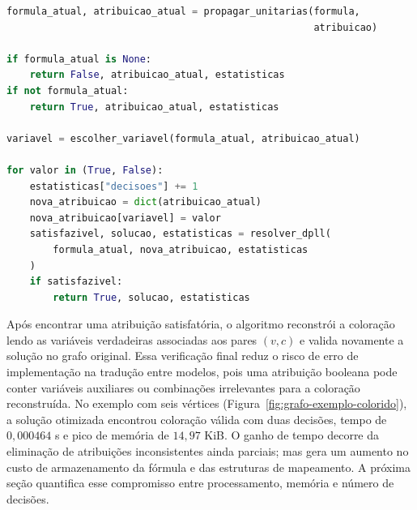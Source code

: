 \begin{lstlisting}[language=Python, caption={Estrutura do DPLL com propagação unitária}, label={lst:dpll}]
formula_atual, atribuicao_atual = propagar_unitarias(formula,
                                                     atribuicao)

if formula_atual is None:
    return False, atribuicao_atual, estatisticas
if not formula_atual:
    return True, atribuicao_atual, estatisticas

variavel = escolher_variavel(formula_atual, atribuicao_atual)

for valor in (True, False):
    estatisticas["decisoes"] += 1
    nova_atribuicao = dict(atribuicao_atual)
    nova_atribuicao[variavel] = valor
    satisfazivel, solucao, estatisticas = resolver_dpll(
        formula_atual, nova_atribuicao, estatisticas
    )
    if satisfazivel:
        return True, solucao, estatisticas
\end{lstlisting}

Após encontrar uma atribuição satisfatória, o algoritmo reconstrói a coloração lendo as variáveis verdadeiras associadas aos pares $(v,c)$ e valida novamente a solução no grafo original. Essa verificação final reduz o risco de erro de implementação na tradução entre modelos, pois uma atribuição booleana pode conter variáveis auxiliares ou combinações irrelevantes para a coloração reconstruída. No exemplo com seis vértices (Figura~\ref{fig:grafo-exemplo-colorido}), a solução otimizada encontrou coloração válida com duas decisões, tempo de $0{,}000464$ s e pico de memória de $14{,}97$ KiB. O ganho de tempo decorre da eliminação de atribuições inconsistentes ainda parciais; mas gera um aumento no custo de armazenamento da fórmula e das estruturas de mapeamento. A próxima seção quantifica esse compromisso entre processamento, memória e número de decisões.
